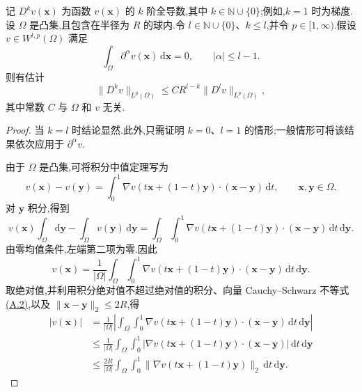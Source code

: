\begin{lemma}\label{lem:appendix-c-3}
记 $D^k v(\bm x)$ 为函数 $v(\bm x)$ 的 $k$ 阶全导数,其中
$k\in\mathbb N\cup\{0\}$;例如,$k=1$ 时为梯度.设 $\Omega$ 是凸集,且包含在半径为 $R$ 的球内.令 $l\in\mathbb N\cup\{0\}$、$k\le l$,并令 $p\in[1,\infty)$.假设 $v\in W^{l,p}(\Omega)$ 满足
\[
 \int_\Omega\partial^\alpha v(\bm x)\,\mathrm d\bm x=0,
 \qquad |\alpha|\le l-1.
\]
则有估计
\[
 \|D^k v\|_{L^p(\Omega)}
 \le CR^{l-k}\|D^l v\|_{L^p(\Omega)},
\]
其中常数 $C$ 与 $\Omega$ 和 $v$ 无关.
\end{lemma}

\begin{proof}
当 $k=l$ 时结论显然.此外,只需证明 $k=0$、$l=1$ 的情形;一般情形可将该结果依次应用于 $\partial^\alpha v$.

由于 $\Omega$ 是凸集,可将积分中值定理写为
\[
 v(\bm x)-v(\bm y)
 =\int_0^1\nabla v(t\bm x+(1-t)\bm y)
   \cdot(\bm x-\bm y)\,\mathrm dt,
 \qquad \bm x,\bm y\in\Omega.
\]
对 $\bm y$ 积分,得到
\[
 v(\bm x)\int_\Omega\mathrm d\bm y
 -\int_\Omega v(\bm y)\,\mathrm d\bm y
 =\int_\Omega\int_0^1
   \nabla v(t\bm x+(1-t)\bm y)\cdot(\bm x-\bm y)
   \,\mathrm dt\,\mathrm d\bm y.
\]
由零均值条件,左端第二项为零.因此
\[
 v(\bm x)=\frac1{|\Omega|}
 \int_\Omega\int_0^1
   \nabla v(t\bm x+(1-t)\bm y)\cdot(\bm x-\bm y)
   \,\mathrm dt\,\mathrm d\bm y.
\]
取绝对值,并利用积分绝对值不超过绝对值的积分、向量 Cauchy--Schwarz 不等式\hyperref[eq:appendix-a-2]{(A.2)},以及
$\|\bm x-\bm y\|_2\le2R$,得
\begin{equation}\label{eq:appendix-c-2}
\begin{aligned}
 |v(\bm x)|
 &=\frac1{|\Omega|}\left|
   \int_\Omega\int_0^1
    \nabla v(t\bm x+(1-t)\bm y)\cdot(\bm x-\bm y)
    \,\mathrm dt\,\mathrm d\bm y\right|\\
 &\le\frac1{|\Omega|}\int_\Omega\int_0^1
   \left|\nabla v(t\bm x+(1-t)\bm y)\cdot(\bm x-\bm y)\right|
   \,\mathrm dt\,\mathrm d\bm y\\
 &\le\frac{2R}{|\Omega|}\int_\Omega\int_0^1
   \|\nabla v(t\bm x+(1-t)\bm y)\|_2
   \,\mathrm dt\,\mathrm d\bm y.
\end{aligned}
\end{equation}


\end{proof}
